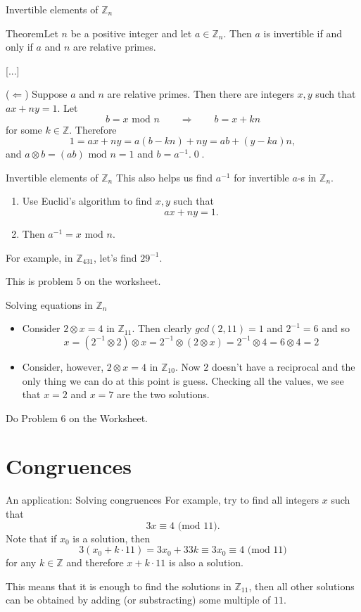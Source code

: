 \documentclass{beamer}
\def\bl[#1]#2{\begin{block}{#1}#2\end{block}}
\def\enumb{\begin{enumerate}}
\def\enume{\end{enumerate}}
\def\itemb{\begin{itemize}}
\def\iteme{\end{itemize}}
\begin{document}
\begin{frame}{Invertible elements of $\mathbb{Z}_n$}
\bl[Theorem]{Let $n$ be a positive integer and let $a\in\mathbb{Z}_n$. Then $a$ is invertible if and only if $a$ and $n$ are relative primes.}
[...]

($\Leftarrow$) Suppose $a$ and $n$ are relative primes. Then there are integers $x,y$ such that $ax+ny=1$. Let 
\[
b=x\textrm{ mod } n\qquad\Rightarrow\qquad b=x+kn
\]
for some $k\in\mathbb{Z}$. Therefore
\[
1=ax+ny=a(b-kn)+ny=ab+(y-ka)n,
\]
and $a\otimes b=(ab)\textrm{ mod }n=1$ and $b=a^{-1}$.\qed.
\end{frame}

\begin{frame}{Invertible elements of $\mathbb{Z}_n$}
This also helps us find $a^{-1}$ for invertible $a$-s in $\mathbb{Z}_n$.
\enumb
\item Use Euclid's algorithm to find $x,y$ such that
\[
ax+ny=1.
\]
\item Then $a^{-1}= x\textrm{ mod }n$.
\enume
For example, in $\mathbb{Z}_{431}$, let's find $29^{-1}$.

\center This is problem $5$ on the worksheet.

\end{frame}

\begin{frame}{Solving equations in $\mathbb{Z}_n$}
\itemb
\item Consider $2\otimes x=4$ in $\mathbb{Z}_{11}$. Then clearly $gcd(2,11)=1$ and $2^{-1}=6$ and so
\[
x=(2^{-1}\otimes 2)\otimes x= 2^{-1}\otimes (2\otimes x)=2^{-1}\otimes 4=6\otimes 4=2
\]
\item Consider, however, $2\otimes x=4$ in $\mathbb{Z}_{10}$. Now $2$ doesn't have a reciprocal and the only thing we can do at this point is guess. Checking all the values, we see that $x=2$ and $x=7$ are the two solutions.
\iteme

\begin{center}
Do Problem 6 on the Worksheet.
\end{center}
\end{frame}

\section{Congruences}

\begin{frame}{An application: Solving congruences}
For example, try to find all integers $x$ such that
\[
3x\equiv 4\textrm{ (mod $11$)}.
\]
Note that if $x_0$ is a solution, then
\[
3(x_0+k\cdot 11)=3x_0+33k\equiv 3x_0\equiv 4\textrm{ (mod $11$)}
\]
for any $k\in\mathbb{Z}$ and therefore $x+k\cdot 11$ is also a solution.\vspace{0.5cm}


\begin{centering}
\color{red} This means that it is enough to find the solutions in $\mathbb{Z}_{11}$, then all other solutions can be obtained by adding (or substracting) some multiple of $11$.\color{black}
\end{centering}
\end{frame}
\end{document}
